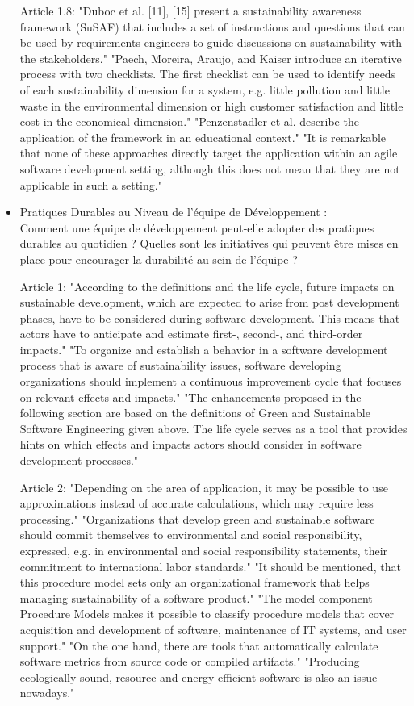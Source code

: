 \begin{itemize}
Article 1.8:
"Duboc et al. [11], [15] present a sustainability awareness framework (SuSAF) that includes a set of instructions and questions that can be used by requirements engineers to guide discussions on sustainability with the stakeholders."
"Paech, Moreira, Araujo, and Kaiser introduce an iterative process with two checklists. The first checklist can be used to identify needs of each sustainability dimension for a system, e.g. little pollution and little waste in the environmental dimension or high customer satisfaction and little cost in the economical dimension."
"Penzenstadler et al. describe the application of the framework in an educational context."
"It is remarkable that none of these approaches directly target the application within an agile software development setting, although this does not mean that they are not applicable in such a setting."
    
    \item Pratiques Durables au Niveau de l'équipe de Développement : \\
    Comment une équipe de développement peut-elle adopter des pratiques durables au quotidien ? Quelles sont les initiatives qui peuvent être mises en place pour encourager la durabilité au sein de l'équipe ?

Article 1:
"According to the definitions and the life cycle, future impacts on sustainable development, which are expected to arise from post development phases, have to be considered during software development. This means that actors have to anticipate and estimate first-, second-, and third-order impacts." 
"To organize and establish a behavior in a software development process that is aware of sustainability issues, software developing organizations should implement a continuous improvement cycle that focuses on relevant effects and impacts." 
"The enhancements proposed in the following section are based on the definitions of Green and Sustainable Software Engineering given above. The life cycle serves as a tool that provides hints on which effects and impacts actors should consider in software development processes."

Article 2:
"Depending on the area of application, it may be possible to use approximations instead of accurate calculations, which may require less processing."
"Organizations that develop green and sustainable software should commit themselves to environmental and social responsibility, expressed, e.g. in environmental and social responsibility statements, their commitment to international labor standards."
"It should be mentioned, that this procedure model sets only an organizational framework that helps managing sustainability of a software product."
"The model component Procedure Models makes it possible to classify procedure models that cover acquisition and development of software, maintenance of IT systems, and user support."
"On the one hand, there are tools that automatically calculate software metrics from source code or compiled artifacts."
"Producing ecologically sound, resource and energy efficient software is also an issue nowadays."


\end{itemize}
